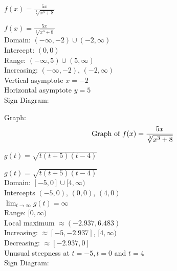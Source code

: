 \documentclass{ximera}
\begin{document}
\begin{question}
\begin {problem}
$f(x) = \frac{5x}{\sqrt[3]{x^{3} + 8}}$

\begin{solution}
$f(x) = \frac{5x}{\sqrt[3]{x^{3} + 8}}$\\
Domain: $(-\infty, -2) \cup (-2, \infty)$\\
Intercept:  $(0,0)$\\
Range:  $(-\infty, 5) \cup (5, \infty)$\\
Increasing: $(-\infty, -2)$, $(-2, \infty)$\\
Vertical asymptote $x = -2$\\
Horizontal asymptote $y = 5$\\
Sign Diagram:\\ 

\smallskip

% 




Graph: \\

$$\text{Graph of $f(x) = \frac{5x}{\sqrt[3]{x^{3} + 8}}$}$$
\end{solution}

\end {problem}

\begin {problem}
$g(t) = \sqrt{t(t + 5)(t - 4)}$
\begin{solution}
$g(t) = \sqrt{t(t + 5)(t - 4)}$\\
Domain: $[-5, 0] \cup [4, \infty)$\\
Intercepts  $(-5,0)$, $(0,0)$, $(4,0)$\\
$ \lim_{t \rightarrow \infty} g(t) = \infty$\\
Range:  $[0, \infty)$\\
Local maximum $\approx (-2.937, 6.483)$\\
Increasing: $\approx [-5, -2.937]$, $[4, \infty)$\\
Decreasing: $\approx [-2.937,0]$\\
Unusual steepness at $t = -5, t = 0$ and $t = 4$\\
Sign Diagram:\\


\end{solution}
\end{problem}
\end{question}
\end{document}
